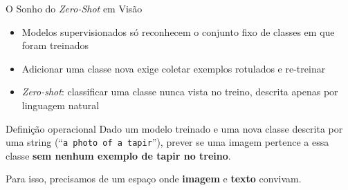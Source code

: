 \documentclass[aspectratio=169,xcolor=dvipsnames]{beamer}
\begin{document}
  \begin{frame}{O Sonho do \textit{Zero-Shot} em Visão}
    \begin{itemize}
      \item Modelos supervisionados só reconhecem o conjunto fixo de classes em que foram treinados
      \item Adicionar uma classe nova exige coletar exemplos rotulados e re-treinar
      \item \textit{Zero-shot}: classificar uma classe nunca vista no treino, descrita apenas por linguagem natural
    \end{itemize}

    \vspace{0.5em}
    \begin{block}{Definição operacional}
      Dado um modelo treinado e uma nova classe descrita por uma string
      (``\texttt{a photo of a tapir}''), prever se uma imagem pertence a essa classe
      \textbf{sem nenhum exemplo de tapir no treino}.
    \end{block}

    \vspace{0.4em}
    Para isso, precisamos de um espaço onde \textbf{imagem} e \textbf{texto} convivam.
  \end{frame}
\end{document}

